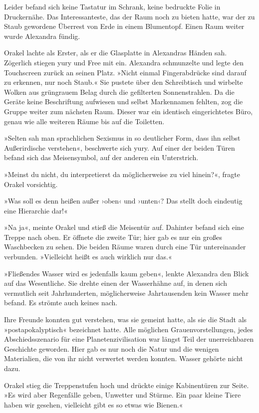 Leider befand sich keine Tastatur im Schrank, keine bedruckte Folie in Druckernähe. Das Interessanteste, das der Raum noch zu bieten hatte, war der zu Staub gewordene Überrest von Erde in einem Blumentopf. Einen Raum weiter wurde Alexandra fündig.

Orakel lachte als Erster, als er die Glasplatte in Alexandras Händen sah. Zögerlich stiegen yury und Free mit ein. Alexandra schmunzelte und legte den Touchscreen zurück an seinen Platz. »Nicht einmal Fingerabdrücke sind darauf zu erkennen, nur noch Staub.« Sie pustete über den Schreibtisch und wirbelte Wolken aus grüngrauem Belag durch die gefilterten Sonnenstrahlen. Da die Geräte keine Beschriftung aufwiesen und selbst Markennamen fehlten, zog die Gruppe weiter zum nächsten Raum. Dieser war ein identisch eingerichtetes Büro, genau wie alle weiteren Räume bis auf die Toiletten.

»Selten sah man sprachlichen Sexismus in so deutlicher Form, dass ihn selbst Außerirdische verstehen«, beschwerte sich yury. Auf einer der beiden Türen befand sich das Meisensymbol, auf der anderen ein Unterstrich.

»Meinst du nicht, du interpretierst da möglicherweise zu viel hinein?«, fragte Orakel vorsichtig.

»Was soll es denn heißen außer ›oben‹ und ›unten‹? Das stellt doch eindeutig eine Hierarchie dar!«

»Na ja«, meinte Orakel und stieß die Meisentür auf. Dahinter befand sich eine Treppe nach oben. Er öffnete die zweite Tür; hier gab es nur ein großes Waschbecken zu sehen. Die beiden Räume waren durch eine Tür untereinander verbunden. »Vielleicht heißt es auch wirklich nur das.«

»Fließendes Wasser wird es jedenfalls kaum geben«, lenkte Alexandra den Blick auf das Wesentliche. Sie drehte einen der Wasserhähne auf, in denen sich vermutlich seit Jahrhunderten, möglicherweise Jahrtausenden kein Wasser mehr befand. Es strömte auch keines nach.

Ihre Freunde konnten gut verstehen, was sie gemeint hatte, als sie die Stadt als »postapokalyptisch« bezeichnet hatte. Alle möglichen Grauenvorstellungen, jedes Abschiedsszenario für eine Planetenzivilisation war längst Teil der unerreichbaren Geschichte geworden. Hier gab es nur noch die Natur und die wenigen Materialien, die von ihr nicht verwertet werden konnten. Wasser gehörte nicht dazu.

Orakel stieg die Treppenstufen hoch und drückte einige Kabinentüren zur Seite. »Es wird aber Regenfälle geben, Unwetter und Stürme. Ein paar kleine Tiere haben wir gesehen, vielleicht gibt es so etwas wie Bienen.«

